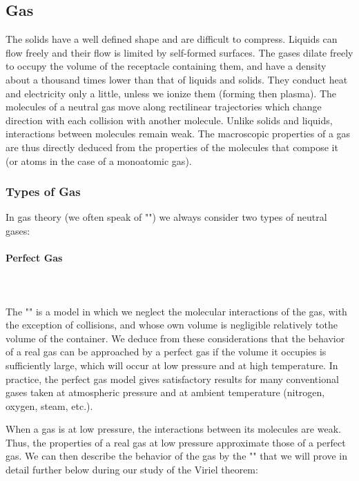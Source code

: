 	\pagebreak
	\subsection{Gas}
	The solids have a well defined shape and are difficult to compress. Liquids can flow freely and their flow is limited by self-formed surfaces. The gases dilate freely to occupy the volume of the receptacle containing them, and have a density about a thousand times lower than that of liquids and solids. They conduct heat and electricity only a little, unless we ionize them (forming then plasma). The molecules of a neutral gas move along rectilinear trajectories which change direction with each collision with another molecule. Unlike solids and liquids, interactions between molecules remain weak. The macroscopic properties of a gas are thus directly deduced from the properties of the molecules that compose it (or atoms in the case of a monoatomic gas).
	
	\subsubsection{Types of Gas}
	In gas theory (we often speak of "") we always consider two types of neutral gases:

	\paragraph{Perfect Gas}\mbox{}\\\\
	The "" is a model in which we neglect the molecular interactions of the gas, with the exception of collisions, and whose own volume is negligible relatively tothe volume of the container. We deduce from these considerations that the behavior of a real gas can be approached by a perfect gas if the volume it occupies is sufficiently large, which will occur at low pressure and at high temperature. In practice, the perfect gas model gives satisfactory results for many conventional gases taken at atmospheric pressure and at ambient temperature (nitrogen, oxygen, steam, etc.).

	When a gas is at low pressure, the interactions between its molecules are weak. Thus, the properties of a real gas at low pressure approximate those of a perfect gas. We can then describe the behavior of the gas by the "" that we will prove in detail further below during our study of the Viriel theorem:
	
